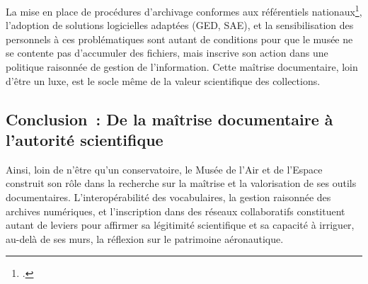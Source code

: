 La mise en place de procédures d’archivage conformes aux référentiels nationaux\footcite{comiteinterministerielauxarchivesdefranceReferentielGeneralGestion}, l’adoption de solutions logicielles adaptées (GED, SAE), et la sensibilisation des personnels à ces problématiques sont autant de conditions pour que le musée ne se contente pas d’accumuler des fichiers, mais inscrive son action dans une politique raisonnée de gestion de l’information. Cette maîtrise documentaire, loin d’être un luxe, est le socle même de la valeur scientifique des collections.


\subsection{Conclusion : De la maîtrise documentaire à l’autorité scientifique}

Ainsi, loin de n’être qu’un conservatoire, le Musée de l’Air et de l’Espace construit son rôle dans la recherche sur la maîtrise et la valorisation de ses outils documentaires. L’interopérabilité des vocabulaires, la gestion raisonnée des archives numériques, et l’inscription dans des réseaux collaboratifs constituent autant de leviers pour affirmer sa légitimité scientifique et sa capacité à irriguer, au-delà de ses murs, la réflexion sur le patrimoine aéronautique.